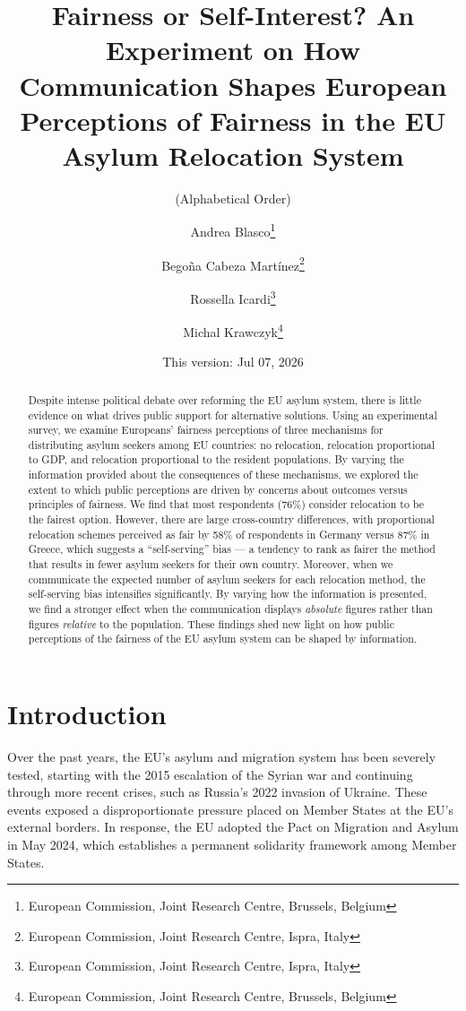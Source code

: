 \documentclass[
  12pt,
  a4paper,
]{article}
\title{Fairness or Self-Interest? An Experiment on How Communication Shapes European Perceptions of Fairness in the EU Asylum Relocation System}
\author{(Alphabetical Order) \and Andrea Blasco\footnote{European Commission, Joint Research Centre, Brussels, Belgium} \and Begoña Cabeza Martínez\footnote{European Commission, Joint Research Centre, Ispra, Italy} \and Rossella Icardi\footnote{European Commission, Joint Research Centre, Ispra, Italy} \and Michal Krawczyk\footnote{European Commission, Joint Research Centre, Brussels, Belgium}}
\date{This version: Jul 07, 2026}
\begin{document}
\maketitle
\begin{abstract}
Despite intense political debate over reforming the EU asylum system, there is little evidence on what drives public support for alternative solutions. Using an experimental survey, we examine Europeans' fairness perceptions of three mechanisms for distributing asylum seekers among EU countries: no relocation, relocation proportional to GDP, and relocation proportional to the resident populations. By varying the information provided about the consequences of these mechanisms, we explored the extent to which public perceptions are driven by concerns about outcomes versus principles of fairness. We find that most respondents (76\%) consider relocation to be the fairest option. However, there are large cross-country differences, with proportional relocation schemes perceived as fair by 58\% of respondents in Germany versus 87\% in Greece, which suggests a ``self-serving'' bias --- a tendency to rank as fairer the method that results in fewer asylum seekers for their own country. Moreover, when we communicate the expected number of asylum seekers for each relocation method, the self-serving bias intensifies significantly. By varying how the information is presented, we find a stronger effect when the communication displays \emph{absolute} figures rather than figures \emph{relative} to the population. These findings shed new light on how public perceptions of the fairness of the EU asylum system can be shaped by information.
\end{abstract}

\clearpage

\section{Introduction}\label{introduction}

Over the past years, the EU's asylum and migration system has been severely tested, starting with the 2015 escalation of the Syrian war and continuing through more recent crises, such as Russia's 2022 invasion of Ukraine. These events exposed a disproportionate pressure placed on Member States at the EU's external borders. In response, the EU adopted the Pact on Migration and Asylum in May 2024, which establishes a permanent solidarity framework among Member States.
\end{document}

